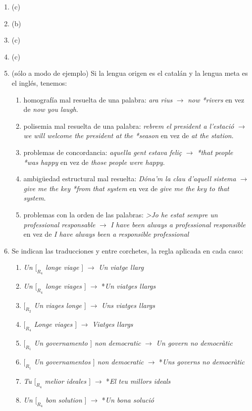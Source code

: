 \begin{enumerate}
\item (c) \item (b) \item (c) \item (c) 

\item (sólo a modo de ejemplo) Si la lengua origen es el catalán y la lengua meta es el inglés, tenemos: \begin{enumerate} \item homografía mal resuelta de una palabra: \emph{ara rius} $\to$ \emph{now *rivers} en vez de \emph{now you laugh}. \item polisemia mal resuelta de una palabra: \emph{rebrem el president a l'estació} $\to$ \emph{we will welcome the president at the *season} en vez de \emph{at the station}. \item problemas de concordancia: \emph{aquella gent estava feliç} $\to$ \emph{*that people *was happy} en vez de  \emph{those people were happy}. \item ambigüedad estructural mal resuelta: \emph{Dóna'm la clau d'aquell sistema} $\to$ \emph{give me the key *from that system} en vez de  \emph{give me the key to that system}. \item problemas con la orden de las palabras: \emph{>Jo he estat sempre un professional responsable} $\to$ \emph{I have been always a professional responsible} en vez de \emph{I have always been a responsible professional} \end{enumerate} 

\item Se indican las traducciones y entre corchetes, la regla aplicada en cada caso: \begin{enumerate} \item \emph{Un $[_{R_4}$ longe viage $]$} $\to$ \emph{Un viatge llarg} \item \emph{Un $[_{R_4}$ longe viages $]$} $\to$ *\emph{Un viatges llargs} \item \emph{$[_{R_2}$ Un viages longe $]$} $\to$ \emph{Uns viatges llargs} \item \emph{$[_{R_4}$ Longe viages $]$} $\to$ \emph{Viatges llargs} \item \emph{$[_{R_1}$ Un governamento $]$ non democratic} $\to$ \emph{Un govern no democràtic} \item \emph{$[_{R_1}$ Un governamentos $]$ non democratic} $\to$ *\emph{Uns governs no democràtic} \item \emph{Tu $[_{R_4}$ melior ideales $]$} $\to$ *\emph{El teu millors ideals} \item \emph{Un $[_{R_4}$ bon solution $]$} $\to$ *\emph{Un bona solució} \end{enumerate} 


\end{enumerate}
